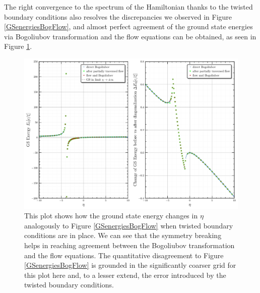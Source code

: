 The right convergence to the spectrum of the Hamiltonian thanks to the twisted boundary conditions also resolves the discrepancies we observed in Figure \ref{GSenergiesBogFlow}, and almost perfect agreement of the ground state energies via Bogoliubov transformation and the flow equations can be obtained, as seen in Figure \ref{ConvergenceImprovementsTwisted}.
\begin{figure}[H]
    \centering
    \includegraphics[width=\textwidth]{figures/plots/PDF/GS_energies_bog_flow_comp_N=40.pdf}
    \caption[Ground state energy with twisted boundary conditions]{This plot shows how the ground state energy changes in $\eta$ analogously to Figure \ref{GSenergiesBogFlow} when twisted boundary conditions are in place. We can see that the symmetry breaking helps in reaching agreement between the Bogoliubov transformation and the flow equations. The quantitative disagreement to Figure \ref{GSenergiesBogFlow} is grounded in the significantly coarser grid for this plot here and, to a lesser extend, the error introduced by the twisted boundary conditions.}
    \label{ConvergenceImprovementsTwisted}
\end{figure}
